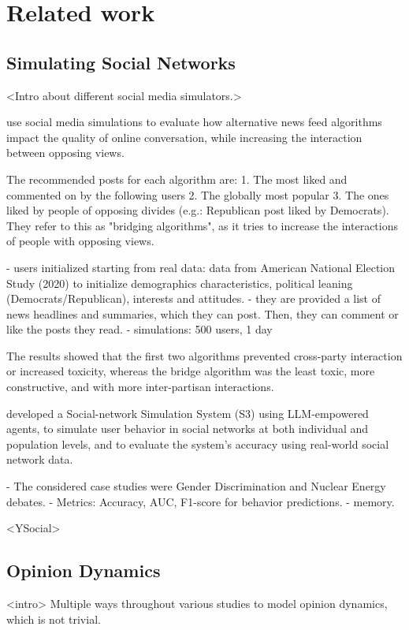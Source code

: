 \section{Related work}
\label{sec:relatedwork}

\subsection{Simulating Social Networks}
<Intro about different social media simulators.>

\citet{törnberg2023simulatingsocialmediausing} use social media simulations to evaluate how alternative news feed algorithms impact the quality of online conversation, while increasing the interaction between opposing views.

The recommended posts for each algorithm are:
1. The most liked and commented on by the following users
2. The globally most popular
3. The ones liked by people of opposing divides (e.g.: Republican post liked by Democrats). They refer to this as "bridging algorithms", as it tries to increase the interactions of people with opposing views.

- users initialized starting from real data: data from American National Election Study (2020) to initialize demographics characteristics, political leaning (Democrats/Republican), interests and attitudes.
- they are provided a list of news headlines and summaries, which they can post. Then, they can comment or like the posts they read.
- simulations: 500 users, 1 day

The results showed that the first two algorithms prevented cross-party interaction or increased toxicity, whereas the bridge algorithm was the least toxic, more constructive, and with more inter-partisan interactions.

\citet{gao2023s3socialnetworksimulationlarge} developed a Social-network Simulation System (S3) using LLM-empowered agents, to simulate user behavior in social networks at both individual and population levels, and to evaluate the system’s accuracy using real-world social network data.

- The considered case studies were Gender Discrimination and Nuclear Energy debates.
- Metrics: Accuracy, AUC, F1-score for behavior predictions.
- memory.

<YSocial>




\subsection{Opinion Dynamics}
<intro> Multiple ways throughout various studies to model opinion dynamics, which is not trivial.

